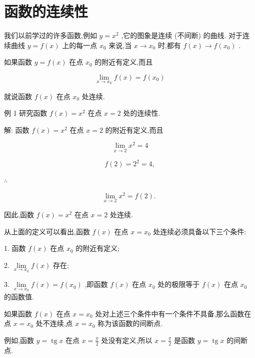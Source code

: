 \documentclass[lang=cn,newtx,10pt,scheme=chinese]{elegantbook}
\begin{document}
\section{函数的连续性}
我们以前学过的许多函数,例如 \(y = {x}^{2}\) ,它的图象是连续 (不间断) 的曲线. 对于连续曲线 \(y = f\left( x\right)\) 上的每一点 \({x}_{0}\) 来说,当 \(x \rightarrow {x}_{0}\) 时,都有 \(f\left( x\right) \rightarrow f\left( {x}_{0}\right)\) .

\begin{definition}[函数的连续性] 

如果函数 \(y = f\left( x\right)\) 在点 \({x}_{0}\) 的附近有定义,而且

\[
\mathop{\lim }\limits_{{x \rightarrow {x}_{0}}}f\left( x\right) = f\left( {x}_{0}\right)
\]

就说函数 \(f\left( x\right)\) 在点 \({x}_{0}\) 处连续.

\end{definition}

例 1 研究函数 \(f\left( x\right) = {x}^{2}\) 在点 \(x = 2\) 处的连续性.

解: 函数 \(f\left( x\right) = {x}^{2}\) 在点 \(x = 2\) 的附近有定义,而且

\[
\mathop{\lim }\limits_{{x \rightarrow 2}}{x}^{2} = 4
\]

\[
f\left( 2\right) = {2}^{2} = 4,
\]

\(\therefore\)

\[
\mathop{\lim }\limits_{{x \rightarrow 2}}{x}^{2} = f\left( 2\right) \text{. }
\]

因此,函数 \(f\left( x\right) = {x}^{2}\) 在点 \(x = 2\) 处连续.

从上面的定义可以看出,函数 \(f\left( x\right)\) 在点 \(x = {x}_{0}\) 处连续必须具备以下三个条件:

1. 函数 \(f\left( x\right)\) 在点 \({x}_{0}\) 的附近有定义;

2. \(\mathop{\lim }\limits_{{x \rightarrow {x}_{0}}}f\left( x\right)\) 存在;

3. \(\mathop{\lim }\limits_{{x \rightarrow {x}_{0}}}f\left( x\right) = f\left( {x}_{0}\right)\) ,即函数 \(f\left( x\right)\) 在点 \({x}_{0}\) 处的极限等于 \(f\left( x\right)\) 在点 \({x}_{0}\) 的函数值.

如果函数 \(f\left( x\right)\) 在点 \(x = {x}_{0}\) 处对上述三个条件中有一个条件不具备,那么函数在点 \(x = {x}_{0}\) 处不连续,点 \(x = {x}_{0}\) 称为该函数的间断点.

例如,函数 \(y = \operatorname{tg}x\) 在点 \(x = \frac{\pi }{2}\) 处没有定义,所以 \(x = \frac{\pi }{2}\) 是函数 \(y = \operatorname{tg}x\) 的间断点.
\end{document}
